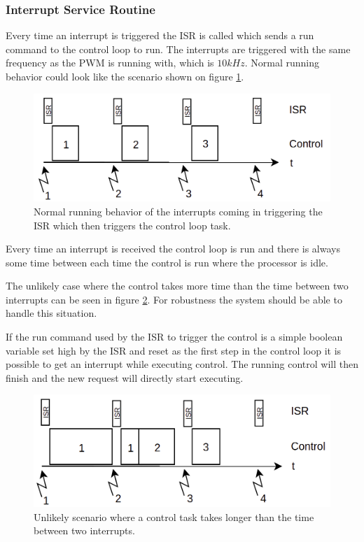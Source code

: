 \subsubsection{Interrupt Service Routine}
\label{sec:isr}
Every time an interrupt is triggered the ISR is called which sends a run command to the control loop to run. The interrupts are triggered with the same frequency as the PWM is running with, which is $10kHz$. Normal running behavior could look like the scenario shown on figure \ref{fig:isr1}. 

\begin{figure}[H]
	\centering
	\includegraphics[width=0.65\linewidth]{pictures/software/isr/isr1.png}
	\caption{Normal running behavior of the interrupts coming in triggering the ISR which then triggers the control loop task.}
	\label{fig:isr1}
\end{figure}

Every time an interrupt is received the control loop is run and there is always some time between each time the control is run where the processor is idle.


The unlikely case where the control takes more time than the time between two interrupts can be seen in figure \ref{fig:isr2}. For robustness the system should be able to handle this situation. 

If the run command used by the ISR to trigger the control is a simple boolean variable set high by the ISR and reset as the first step in the control loop it is possible to get an interrupt while executing control. The running control will then finish and the new request will directly start executing.

\begin{figure}[H]
	\centering
	\includegraphics[width=0.65\linewidth]{pictures/software/isr/isr2.png}
	\caption{Unlikely scenario where a control task takes longer than the time between two interrupts.}
	\label{fig:isr2}
\end{figure}

